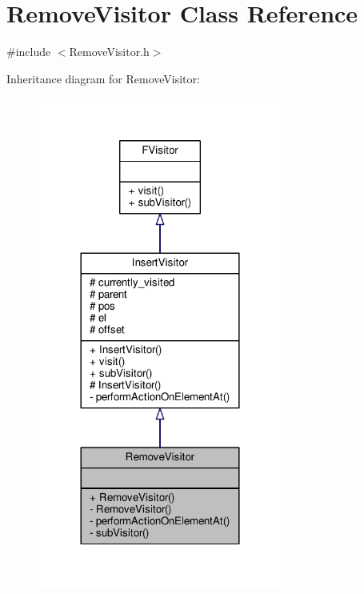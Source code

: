 \hypertarget{classRemoveVisitor}{}\section{Remove\+Visitor Class Reference}
\label{classRemoveVisitor}


{\ttfamily \#include $<$Remove\+Visitor.\+h$>$}



Inheritance diagram for Remove\+Visitor\+:
\nopagebreak
\begin{figure}[H]
\begin{center}
\leavevmode
\includegraphics[width=228pt]{classRemoveVisitor__inherit__graph}
\end{center}
\end{figure}


